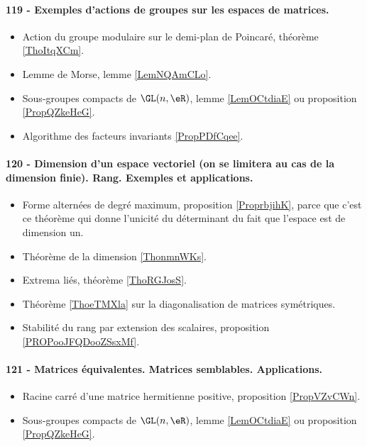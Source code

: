 \paragraph{119 - Exemples d’actions de groupes sur les espaces de matrices.}
\begin{itemize}
    \item Action du groupe modulaire sur le demi-plan de Poincaré, théorème \ref{ThoItqXCm}.
    \item Lemme de Morse, lemme \ref{LemNQAmCLo}.
    \item Sous-groupes compacts de \( \GL(n,\eR)\), lemme \ref{LemOCtdiaE} ou proposition \ref{PropQZkeHeG}.
    \item Algorithme des facteurs invariants \ref{PropPDfCqee}.
\end{itemize}

\paragraph{120 - Dimension d'un espace vectoriel (on se limitera au cas de la dimension finie). Rang. Exemples et applications.}
\begin{itemize}
    \item Forme alternées de degré maximum, proposition \ref{ProprbjihK}, parce que c'est ce théorème qui donne l'unicité du déterminant du fait que l'espace est de dimension un.
    \item Théorème de la dimension \ref{ThonmnWKs}.
    \item Extrema liés, théorème \ref{ThoRGJosS}.
    \item Théorème \ref{ThoeTMXla} sur la diagonalisation de matrices symétriques.
    \item Stabilité du rang par extension des scalaires, proposition \ref{PROPooJFQDooZSsxMf}.
\end{itemize}
\paragraph{121 - Matrices équivalentes. Matrices semblables. Applications.}
\begin{itemize}
    \item Racine carré d'une matrice hermitienne positive, proposition \ref{PropVZvCWn}.
    \item Sous-groupes compacts de \( \GL(n,\eR)\), lemme \ref{LemOCtdiaE} ou proposition \ref{PropQZkeHeG}.
\end{itemize}
